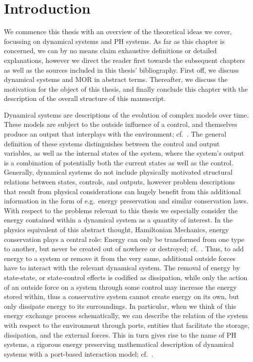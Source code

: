 \chapter{Introduction}\label{chap:introduction}

We commence this thesis with an overview of the theoretical ideas we cover, focussing on dynamical systems and \ac{PH} systems.
As far as this chapter is concerned, we can by no means claim exhaustive definitions or detailed explanations, however we direct the reader first towards the subsequent chapters as well as the sources included in this thesis' bibliography.
First off, we discuss dynamical systems and \ac{MOR} in abstract terms.
Thereafter, we discuss the motivation for the object of this thesis, and finally conclude this chapter with the description of the overall structure of this manuscript.

Dynamical systems are descriptions of the evolution of complex models over time.
These models are subject to the outside influence of a control, and themselves produce an output that interplays with the environment; cf.~\cite{Hinrichsen2005}.
The general definition of these systems distinguishes between the control and output variables, as well as the internal states of the system, where the system's output is a combination of potentially both the current states as well as the control.
Generally, dynamical systems do not include physically motivated structural relations between states, controls, and outputs, however problem descriptions that result from physical considerations can hugely benefit from this additional information in the form of e.g.\ energy preservation and similar conservation laws.
With respect to the problems relevant to this thesis we especially consider the energy contained within a dynamical system as a quantity of interest.
In the physics equivalent of this abstract thought, Hamiltonian Mechanics, energy conservation plays a central role: Energy can only be transformed from one type to another, but never be created out of nowhere or destroyed; cf.~\cite{Taylor2005, Giorgilli2022}.
Thus, to add energy to a system or remove it from the very same, additional outside forces have to interact with the relevant dynamical system.
The removal of energy by state-state, or state-control effects is codified as dissipation, while only the action of an outside force on a system through some control may increase the energy stored within, thus a conservative system cannot create energy on its own, but only dissipate energy to its surroundings.
In particular, when we think of this energy exchange process schematically, we can describe the relation of the system with respect to the environment through ports, entities that facilitate the storage, dissipation, and the external forces.
This in turn gives rise to the name of \ac{PH} systems, a rigorous energy preserving mathematical description of dynamical systems with a port-based interaction model; cf.~\cite{Duindam2009, Jacob2012, VanDerSchaft2014, Mehrmann2022}.

